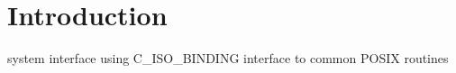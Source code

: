     

    \hypertarget{index_Introduction}{}\section{Introduction}\label{index_Introduction}
system interface using C\+\_\+\+I\+S\+O\+\_\+\+B\+I\+N\+D\+I\+NG interface to common P\+O\+S\+IX routines

      